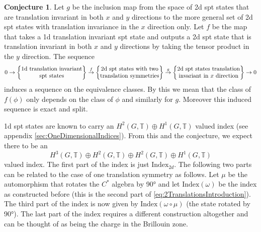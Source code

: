 \documentclass[12pt,a4paper,twoside]{article}
\let\originalleft\left
\let\originalright\right
\renewcommand{\left}{\mathopen{}\mathclose\bgroup\originalleft}
\renewcommand{\right}{\aftergroup\egroup\originalright}
\newcommand{\TT}{\mathbb T}
\theoremstyle{definition}
\newtheorem{conjecture}[theorem]{Conjecture}
\numberwithin{equation}{section}
\begin{document}
\begin{conjecture}\label{conj2}
	Let $g$ be the inclusion map from the space of 2d spt states that are translation invariant in both $x$ and $y$ directions to the more general set of 2d spt states with translation invariance in the $x$ direction only. Let $f$ be the map that takes a 1d translation invariant spt state and outputs a 2d spt state that is translation invariant in both $x$ and $y$ directions by taking the tensor product in the $y$ direction. The sequence
	\begin{equation}
		0\rightarrow\left\{\begin{matrix}\text{1d translation invariant}\\ \text{spt states}\end{matrix}\right\}\stackrel{f}{\rightarrow}\left\{\begin{matrix}\text{2d spt states with two}\\ \text{translation symmetries}\end{matrix}\right\}\stackrel{g}{\rightarrow}\left\{\begin{matrix}\text{2d spt states translation}\\ \text{invariant in $x$ direction}\end{matrix}\right\}\rightarrow 0
	\end{equation}
	induces a sequence on the equivalence classes. By this we mean that the class of $f(\phi)$ only depends on the class of $\phi$ and similarly for $g$. Moreover this induced sequence is exact and split.
\end{conjecture}
1d spt states are known to carry an $H^2(G,\TT)\oplus H^1(G,\TT)$ valued index (see appendix \ref{sec:OneDimensionalIndices}). From this and the conjecture, we expect there to be an
\begin{equation}\label{eq:2TranslationsIntroduction}
	H^3(G,\TT)\oplus H^2(G,\TT)\oplus H^2(G,\TT)\oplus H^1(G,\TT)
\end{equation}
valued index. The first part of the index is just $\textrm{Index}_{2d}$. The following two parts can be related to the case of one translation symmetry as follows. Let $\mu$ be the automorphism that rotates the $C^*$ algebra by 90° and let $\textrm{Index}(\omega)$ be the index as constructed before (this is the second part of \ref{eq:2TranslationsIntroduction}). The third part of the index is now given by $\textrm{Index}(\omega\circ\mu)$ (the state rotated by 90°). The last part of the index requires a different construction altogether and can be thought of as being the charge in the Brillouin zone.\\\\
\end{document}
